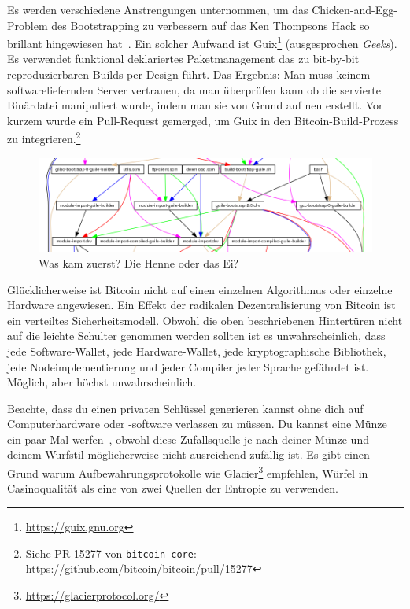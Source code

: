 Es werden verschiedene Anstrengungen unternommen, um das Chicken-and-Egg-Problem
des Bootstrapping zu verbessern auf das Ken Thompsons Hack so brillant
hingewiesen hat~\cite{web:bootstrapping}. Ein solcher Aufwand ist
Guix\footnote{\url{https://guix.gnu.org}} (ausgesprochen \textit{Geeks}). Es
verwendet funktional deklariertes Paketmanagement das zu bit-by-bit
reproduzierbaren Builds per Design führt. Das Ergebnis: Man muss keinem
softwareliefernden Server vertrauen, da man überprüfen kann ob die servierte
Binärdatei manipuliert wurde, indem man sie von Grund auf neu erstellt. Vor
kurzem wurde ein Pull-Request gemerged, um Guix in den Bitcoin-Build-Prozess zu
integrieren.\footnote{Siehe PR 15277 von \texttt{bitcoin-core}: \\
\url{https://github.com/bitcoin/bitcoin/pull/15277}}

\begin{figure}
  \includegraphics{assets/images/guix-bootstrap-dependencies.png}
  \caption{Was kam zuerst? Die Henne oder das Ei?}
  \label{fig:guix-bootstrap-dependencies}
\end{figure}

Glücklicherweise ist Bitcoin nicht auf einen einzelnen Algorithmus oder einzelne
Hardware angewiesen. Ein Effekt der radikalen Dezentralisierung von Bitcoin ist
ein verteiltes Sicherheitsmodell. Obwohl die oben beschriebenen Hintertüren
nicht auf die leichte Schulter genommen werden sollten ist es unwahrscheinlich,
dass jede Software-Wallet, jede Hardware-Wallet, jede kryptographische
Bibliothek, jede Nodeimplementierung und jeder Compiler jeder Sprache gefährdet
ist. Möglich, aber höchst unwahrscheinlich.

Beachte, dass du einen privaten Schlüssel generieren kannst ohne dich auf
Computerhardware oder -software verlassen zu müssen. Du kannst eine Münze ein
paar Mal werfen~\cite{antonopoulos2014mastering}, obwohl diese Zufallsquelle je
nach deiner Münze und deinem Wurfstil möglicherweise nicht ausreichend zufällig
ist. Es gibt einen Grund warum Aufbewahrungsprotokolle wie
Glacier\footnote{\url{https://glacierprotocol.org/}} empfehlen, Würfel in
Casinoqualität als eine von zwei Quellen der Entropie zu verwenden.

